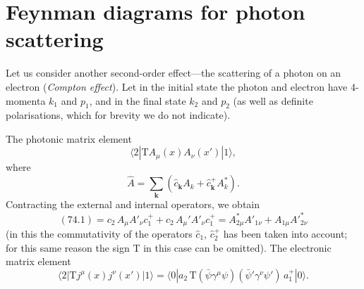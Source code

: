 \section{Feynman diagrams for photon scattering}

Let us consider another second-order effect---the scattering of a photon on an electron (\textit{Compton effect}). Let in the initial state the photon and electron have 4-momenta $k_1$ and $p_1$, and in the final state $k_2$ and $p_2$ (as well as definite polarisations, which for brevity we do not indicate).

The photonic matrix element
\begin{equation}
\langle 2|\mathrm{T}A_\mu(x)A_\nu(x')|1\rangle,
\tag{74.1}
\end{equation}
where
\[
\hat{A} = \sum_\mathbf{k}(\hat{c}_\mathbf{k} A_k + \hat{c}_\mathbf{k}^+ A_k^*).
\]
Contracting the external and internal operators, we obtain
\begin{equation}
(74.1) = c_2\,A_\mu A'_\nu c_1^+ + c_2\,A_\mu' A'_\nu c_1^+ = A^*_{2\mu}A'_{1\nu} + A_{1\mu} A'^*_{2\nu}
\tag{74.2}
\end{equation}
(in this the commutativity of the operators $\hat{c}_1$, $\hat{c}_2^+$ has been taken into account; for this same reason the sign T in this case can be omitted). The electronic matrix element
\begin{equation}
\langle 2|\mathrm{T}j^\mu(x)j^\nu(x')|1\rangle = \langle 0|a_2\,\mathrm{T}(\bar{\psi}\gamma^\mu\psi)(\bar{\psi}'\gamma^\nu\psi')\,a_1^+|0\rangle.
\tag{74.3}
\end{equation}

